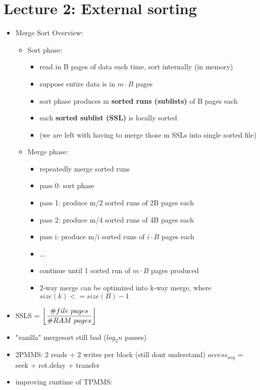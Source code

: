 \documentclass{article}
\DeclarePairedDelimiter\floor{\lfloor}{\rfloor}
\begin{document}
\section{Lecture 2: External sorting}
\begin{itemize}
\item Merge Sort Overview:
    \begin{itemize}
    \item Sort phase: 
        \begin{itemize}
            \item read in B pages of data each time, sort internally (in memory)
            \item suppose entire data is in $m \cdot B$ pages
            \item sort phase produces m \textbf{sorted runs (sublists)} of B pages each
            \item each \textbf{sorted sublist (SSL)} is locally sorted
            \item (we are left with having to merge those m SSLs into single sorted file)
        \end{itemize}
    \item Merge phase: 
        \begin{itemize}
            \item repeatedly merge sorted runs
            \item pass 0: sort phase
            \item pass 1: produce m/2 sorted runs of 2B pages each
            \item pass 2: produce m/4 sorted runs of 4B pages each
            \item pass i: produce m/i sorted runs of $i \cdot B$ pages each
            \item ...
            \item continue until 1 sorted run of $m \cdot B$ pages produced
            \item 2-way merge can be optimized into k-way merge, where $size(k) <= size(B) - 1$
        \end{itemize}
    \end{itemize}
\item SSLS = $\displaystyle\floor*{\frac{\#file\ pages}{\#RAM\ pages}}$
\item "vanilla" mergesort still bad ($log_{2}n$ passes)
\item 2PMMS: 2 reads + 2 writes per block (still dont understand)
    \subitem $access_{avg}$ = seek + rot.delay + transfer
\item improving  runtime of TPMMS:

\end{itemize}
\end{document}
